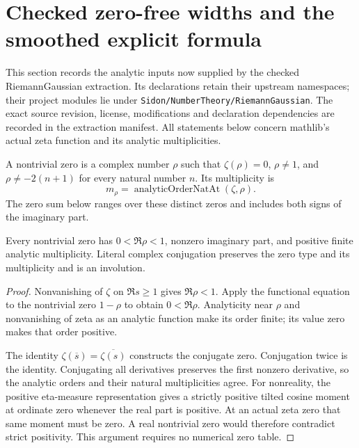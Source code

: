 \section{Checked zero-free widths and the smoothed explicit formula}

This section records the analytic inputs now supplied by the checked
RiemannGaussian extraction.  Its declarations retain their upstream
namespaces; their project modules lie under
\texttt{Sidon/NumberTheory/RiemannGaussian}.
The exact source revision, license, modifications and declaration
dependencies are recorded in the extraction manifest.
All statements below concern mathlib's actual zeta function and its
analytic multiplicities.

\begin{definition}
\label{analytic:zero-model}
\leanok
A nontrivial zero is a complex number $\rho$ such that
$\zeta(\rho)=0$, $\rho\ne1$, and
$\rho\ne-2(n+1)$ for every natural number $n$.
Its multiplicity is
\[
 m_\rho=\operatorname{analyticOrderNatAt}(\zeta,\rho).
\]
The zero sum below ranges over these distinct zeros and includes both
signs of the imaginary part.
\end{definition}

\begin{lemma}
\label{analytic:zero-symmetry}
\leanok
Every nontrivial zero has $0<\Re\rho<1$, nonzero imaginary part, and
positive finite analytic multiplicity.  Literal complex conjugation
preserves the zero type and its multiplicity and is an involution.
\end{lemma}
\begin{proof}
Nonvanishing of $\zeta$ on $\Re s\ge1$ gives $\Re\rho<1$.
Apply the functional equation to the nontrivial zero $1-\rho$ to
obtain $0<\Re\rho$.  Analyticity near $\rho$ and nonvanishing of
zeta as an analytic function make its order finite; its value zero
makes that order positive.

The identity $\zeta(\overline s)=\overline{\zeta(s)}$ constructs
the conjugate zero.  Conjugation twice is the identity.
Conjugating all derivatives preserves the first nonzero derivative,
so the analytic orders and their natural multiplicities agree.
For nonreality, the positive eta-measure representation gives a
strictly positive tilted cosine moment at ordinate zero whenever
the real part is positive.  At an actual zeta zero that same moment
must be zero.  A real nontrivial zero would therefore contradict
strict positivity.  This argument requires no numerical zero table.
\end{proof}

